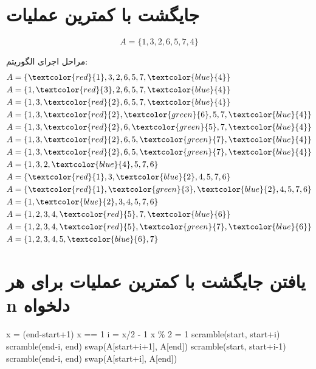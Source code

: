 \section{جایگشت با کمترین عملیات}

\newcommand{\co}[2]{\textcolor{#1}{#2}}

\begin{equation*}
	A = \{1,3,2,6,5,7,4\}
\end{equation*}

مراحل اجرای الگوریتم:
\begin{align*}
	&A = \{\co{red}{1},3,2,6,5,7,\co{blue}{4}\} \\
	&A = \{1,\co{red}{3},2,6,5,7,\co{blue}{4}\} \\
	&A = \{1,3,\co{red}{2},6,5,7,\co{blue}{4}\} \\
	&A = \{1,3,\co{red}{2},\co{green}{6},5,7,\co{blue}{4}\} \\
	&A = \{1,3,\co{red}{2},6,\co{green}{5},7,\co{blue}{4}\} \\
	&A = \{1,3,\co{red}{2},6,5,\co{green}{7},\co{blue}{4}\} \\
	&A = \{1,3,\co{red}{2},6,5,\co{green}{7},\co{blue}{4}\} \\
	&A = \{1,3,2,\co{blue}{4},5,7,6\} \\
	&A = \{\co{red}{1},3,\co{blue}{2},4,5,7,6\} \\
	&A = \{\co{red}{1},\co{green}{3},\co{blue}{2},4,5,7,6\} \\
	&A = \{1,\co{blue}{2},3,4,5,7,6\} \\
	&A = \{1,2,3,4,\co{red}{5},7,\co{blue}{6}\} \\
	&A = \{1,2,3,4,\co{red}{5},\co{green}{7},\co{blue}{6}\} \\
	&A = \{1,2,3,4,5,\co{blue}{6},7\} \\
\end{align*}

\section{
یافتن جایگشت با کمترین عملیات برای هر n دلخواه
}

\begin{latin}
\begin{codebox}  
\li		x = (end-start+1)
\li		\If x == 1 \Then
\li			\Return
 		\End
\li		i = x/2 - 1
\li		\If x \% 2 = 1 \Then
\li		scramble(start, start+i)
\li		scramble(end-i, end)
\li		swap(A[start+i+1], A[end])	
\li		\Else
\li		scramble(start, start+i-1)
\li		scramble(end-i, end)	
\li		swap(A[start+i], A[end])	
		\End

\end{codebox}
\end{latin}
